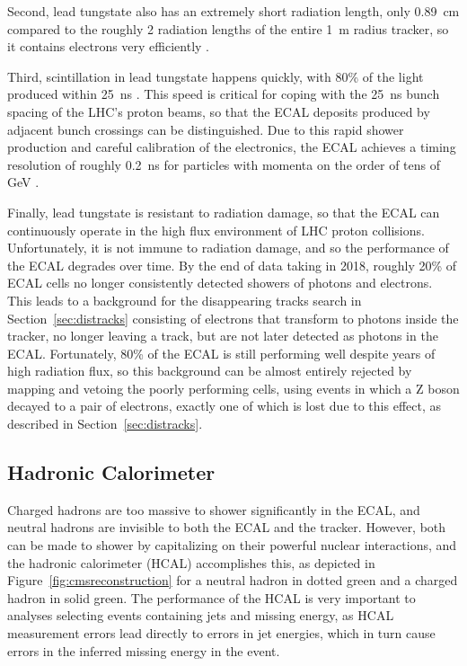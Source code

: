   Second, lead tungstate also has an extremely short radiation length, only 0.89~cm compared to the roughly 2 radiation lengths of the entire 1~m radius tracker, so it contains electrons very efficiently \cite{cms_tdr}.

  Third, scintillation in lead tungstate happens quickly, with 80\% of the light produced within 25~ns \cite{cms_tdr}. 
  This speed is critical for coping with the 25~ns bunch spacing of the LHC's proton beams, so that the ECAL deposits produced by adjacent bunch crossings can be distinguished.
  Due to this rapid shower production and careful calibration of the electronics, the ECAL achieves a timing resolution of roughly 0.2~ns for particles with momenta on the order of tens of GeV \cite{ecaltiming}.

  Finally, lead tungstate is resistant to radiation damage, so that the ECAL can continuously operate in the high flux environment of LHC proton collisions.
  Unfortunately, it is not immune to radiation damage, and so the performance of the ECAL degrades over time.
  By the end of data taking in 2018, roughly 20\% of ECAL cells no longer consistently detected showers of photons and electrons.
  This leads to a background for the disappearing tracks search in Section~\ref{sec:distracks} consisting of electrons that transform to photons inside the tracker, no longer leaving a track, but are not later detected as photons in the ECAL.
  Fortunately, 80\% of the ECAL is still performing well despite years of high radiation flux, so this background can be almost entirely rejected by mapping and vetoing the poorly performing cells, using events in which a Z boson decayed to a pair of electrons, exactly one of which is lost due to this effect, as described in Section~\ref{sec:distracks}.

  \subsection{Hadronic Calorimeter} \label{sec:hcal}

  Charged hadrons are too massive to shower significantly in the ECAL, and neutral hadrons are invisible to both the ECAL and the tracker.
  However, both can be made to shower by capitalizing on their powerful nuclear interactions, and the hadronic calorimeter (HCAL) accomplishes this, as depicted in Figure~\ref{fig:cmsreconstruction} for a neutral hadron in dotted green and a charged hadron in solid green.
  The performance of the HCAL is very important to analyses selecting events containing jets and missing energy, as HCAL measurement errors lead directly to errors in jet energies, which in turn cause errors in the inferred missing energy in the event.

